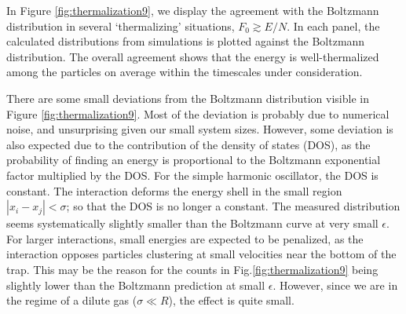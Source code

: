 \documentclass[a4paper, onecolumn]{revtex4-1}
\begin{document}
In Figure \ref{fig:thermalization9}, we display the agreement with the Boltzmann distribution in
several `thermalizing' situations, $F_0\gtrsim E/N$.  In each panel, the calculated distributions
from simulations is plotted against the Boltzmann distribution.  The overall agreement shows that
the energy is well-thermalized among the particles on average within the timescales under
consideration.


There are some small deviations from the Boltzmann distribution visible in Figure
\ref{fig:thermalization9}.  Most of the deviation is probably due to numerical noise, and
unsurprising given our small system sizes.  However, some deviation is also expected due to the
contribution of the density of states (DOS), as the probability of finding an energy is proportional
to the Boltzmann exponential factor multiplied by the DOS.  For the simple harmonic oscillator, the
DOS is constant.  The interaction deforms the energy shell in the small region $|x_i-x_j|<\sigma$;
so that the DOS is no longer a constant.  The measured distribution seems systematically slightly
smaller than the Boltzmann curve at very small $\epsilon$.  For larger interactions, small energies
are expected to be penalized, as the interaction opposes particles clustering at small velocities
near the bottom of the trap.  This may be the reason for the counts in Fig.\ref{fig:thermalization9}
being slightly lower than the Boltzmann prediction at small $\epsilon$.  However, since we are in
the regime of a dilute gas ($\sigma\ll R$), the effect is quite small.

\end{document}
